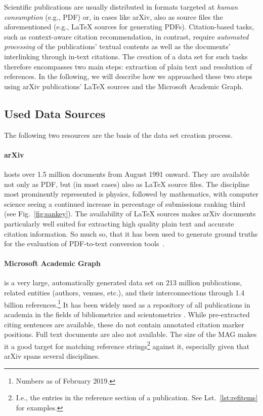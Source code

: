 Scientific publications are usually distributed in formats targeted at \emph{human consumption} (e.g., PDF) or, in cases like arXiv, also as source files the aforementioned (e.g., \LaTeX{} sources for generating PDFs). Citation-based tasks, such as context-aware citation recommendation, in contrast, require \emph{automated processing} of the publications' textual contents as well as the documents' interlinking through in-text citations. The creation of a data set for such tasks therefore encompasses two main steps: extraction of plain text and resolution of references. In the following, we will describe how we approached these two steps using arXiv publications' \LaTeX{} sources and the Microsoft Academic Graph.

\subsection{Used Data Sources}
The following two resources are the basis of the data set creation process.

\paragraph{arXiv} hosts over 1.5 million documents from August 1991 onward.%
 They are available not only as PDF, but (in most cases) also as \LaTeX{} source files. The discipline most prominently represented is physics, followed by mathematics, with computer science seeing a continued increase in percentage of submissions ranking third (see Fig.~\ref{fig:sankey}). The availability of \LaTeX{} sources makes arXiv documents particularly well suited for extracting high quality plain text and accurate citation information. So much so, that it has been used to generate ground truths for the evaluation of PDF-to-text conversion tools~\cite{Bast2017}.
\paragraph{Microsoft Academic Graph} is a very large, automatically generated data set on 213 million publications, related entities (authors, venues, etc.), and their interconnections through 1.4 billion references.\footnote{Numbers as of February 2019.} It has been widely used as a repository of all publications in academia in the fields of bibliometrics and scientometrics \cite{Mohapatra2019}. While pre-extracted citing sentences are available, these do not contain annotated citation marker positions. Full text documents are also not available. The size of the MAG makes it a good target for matching reference strings\footnote{I.e., the entries in the reference section of a publication. See Lst.~\ref{lst:refitems} for examples.} against it, especially given that arXiv spans several disciplines.

